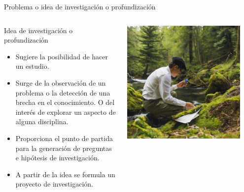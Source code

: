 \documentclass [xcolor=svgnames, t] {beamer}
\begin{document}
\begin{frame}{Problema o idea de investigaci\'on o profundizaci\'on}
\begin{columns}
\begin{exampleblock}{Idea de investigaci\'on o profundizaci\'on}
\begin{itemize}
\item Sugiere la posibilidad de hacer un estudio.
\item Surge de la observaci\'on de un problema o la detecci\'on de una brecha en el conocimiento. O del inter\'es de explorar un aspecto de alguna disciplina.
\item Proporciona el punto de partida para la generaci\'on de preguntas e hip\'otesis de investigaci\'on.
\item A partir de la idea se formula un proyecto de investigaci\'on.
\end{itemize}
\end{exampleblock}
\includegraphics[width=0.9\textwidth]{fig3_1}
\end{columns}
\end{frame}


\end{document}
